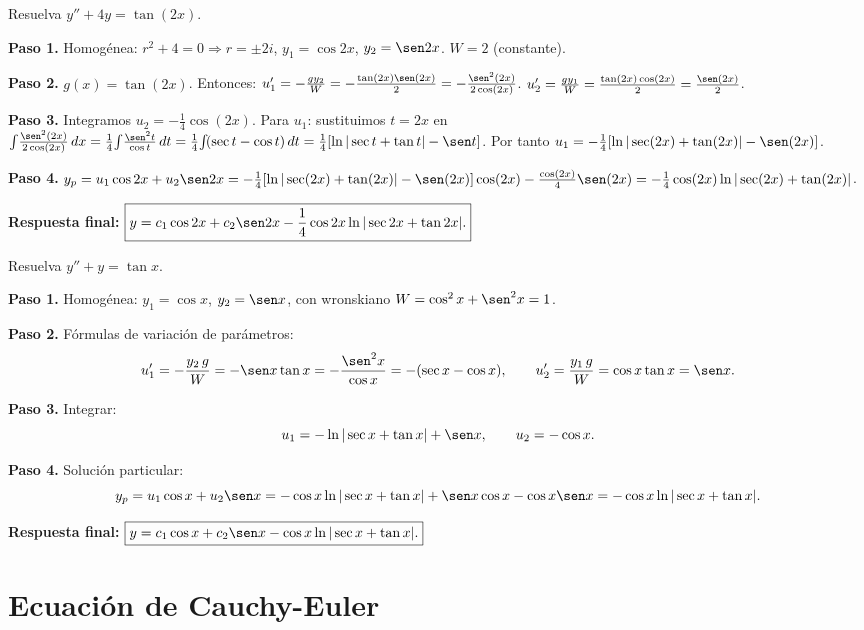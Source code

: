 \begin{example}[$g(x) = \tan x$]
Resuelva $y'' + 4y = \tan(2x)$.

\begin{myproof}
\textbf{Paso 1.} Homogénea: $r^2+4=0 \Rightarrow r=\pm 2i$, $y_1=\cos 2x$, $y_2=\sen 2x$. $W = 2$ (constante).

\textbf{Paso 2.} $g(x)=\tan(2x)$. Entonces:
$u_1' = -\frac{g y_2}{W} = -\frac{\tan(2x) \sen(2x)}{2} = -\frac{\sen^2(2x)}{2\cos(2x)}$.
$u_2' = \frac{g y_1}{W} = \frac{\tan(2x) \cos(2x)}{2} = \frac{\sen(2x)}{2}$.

\textbf{Paso 3.} Integramos $u_2 = -\frac{1}{4}\cos(2x)$. Para $u_1$: sustituimos $t=2x$ en $\int\!\frac{\sen^2(2x)}{2\cos(2x)}\,dx = \frac{1}{4}\!\int\!\frac{\sen^2 t}{\cos t}\,dt = \frac{1}{4}\!\int\!(\sec t-\cos t)\,dt = \frac{1}{4}[\ln|\sec t+\tan t|-\sen t]$. Por tanto $u_1 = -\frac{1}{4}[\ln|\sec(2x)+\tan(2x)|-\sen(2x)]$.

\textbf{Paso 4.} $y_p = u_1\cos 2x + u_2\sen 2x = -\tfrac{1}{4}[\ln|\sec(2x)+\tan(2x)|-\sen(2x)]\cos(2x) - \tfrac{\cos(2x)}{4}\sen(2x) = -\tfrac{1}{4}\cos(2x)\ln|\sec(2x)+\tan(2x)|$.

\textbf{Respuesta final:} $\boxed{y = c_1 \cos 2x + c_2 \sen 2x - \frac{1}{4}\cos 2x\ln|\sec 2x + \tan 2x|.}$
\end{myproof}
\end{example}

\begin{example}
Resuelva $y'' + y = \tan x$.

\begin{myproof}
\textbf{Paso 1.} Homogénea: $y_1=\cos x$, $y_2=\sen x$, con wronskiano $W=\cos^2 x+\sen^2 x=1$.

\textbf{Paso 2.} Fórmulas de variación de parámetros:
\[
u_1'=-\frac{y_2\,g}{W}=-\sen x\tan x=-\frac{\sen^2 x}{\cos x}=-(\sec x-\cos x),\qquad
u_2'=\frac{y_1\,g}{W}=\cos x\tan x=\sen x.
\]

\textbf{Paso 3.} Integrar:
\[
u_1=-\ln|\sec x+\tan x|+\sen x,\qquad u_2=-\cos x.
\]

\textbf{Paso 4.} Solución particular:
\[
y_p=u_1\cos x+u_2\sen x=-\cos x\ln|\sec x+\tan x|+\sen x\cos x-\cos x\sen x=-\cos x\ln|\sec x+\tan x|.
\]

\textbf{Respuesta final:} $\boxed{y=c_1\cos x+c_2\sen x-\cos x\ln|\sec x+\tan x|.}$
\end{myproof}
\end{example}

\section{Ecuación de Cauchy-Euler}

